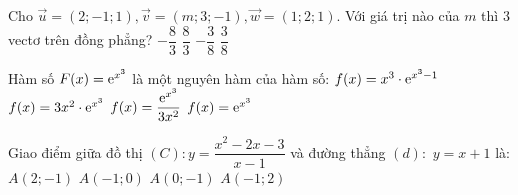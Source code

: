 \begin{ex}%
Cho $\vec{u}=(2;-1; 1), \vec{v}=(m; 3;-1), \vec{w}=(1; 2; 1)$. Với giá trị nào của $m$ thì $3$ vectơ trên đồng phẳng?
\choice
{\True $-\dfrac{8}{3}$}
{$\dfrac{8}{3}$}
{$-\dfrac{3}{8}$}
{$\dfrac{3}{8}$}

\end{ex}
\begin{ex}%
Hàm số $F(x)={\rm e}^{x^3}$ là một nguyên hàm của hàm số:
\choice
{$f(x)=x^3 \cdot {\rm e}^{x^3-1}$}
{\True $f(x)=3 x^2 \cdot {\rm e}^{x^3}$}
{$f(x)=\dfrac{{\rm e}^{x^3}}{3 x^2}$}
{$f(x)={\rm e}^{x^3}$}

\end{ex}
\begin{ex}%
Giao điểm giữa đồ thị $(C)\colon y=\dfrac{x^2-2 x-3}{x-1}$ và đường thẳng $(d):$ $y=x+1$ là:
\choice
{$A(2;-1)$}
{\True $A(-1; 0)$}
{$A(0;-1)$}
{$A(-1; 2)$}

\end{ex}

